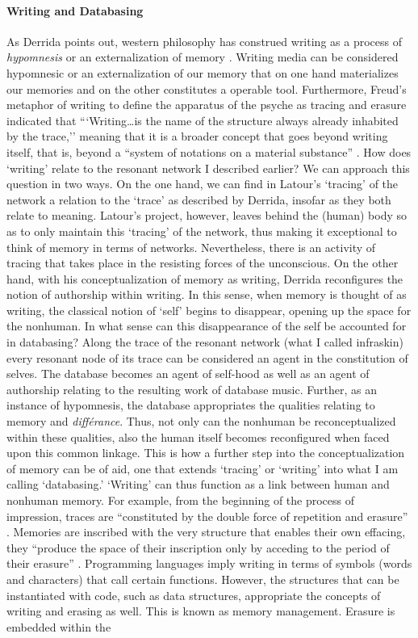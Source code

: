 \paragraph{Writing and Databasing}
As Derrida points out, western philosophy has construed writing as a process of \textit{hypomnesis} or an externalization of memory \parencite[221]{Der78:Wri}. Writing media can be considered hypomnesic or an externalization of our memory that on one hand materializes our memories and on the other constitutes a operable tool. Furthermore, Freud's metaphor of writing to define the apparatus of the psyche as tracing and erasure indicated that ```Writing\dots is the name of the structure always already inhabited by the trace,'' meaning that it is a broader concept that goes beyond writing itself, that is, beyond a ``system of notations on a material sub­stance'' \parencite[xxxix]{Der76:Of}. How does `writing' relate to the resonant network I described earlier? We can approach this question in two ways. On the one hand, we can find in Latour's `tracing' of the network a relation to the `trace' as described by Derrida, insofar as they both relate to meaning. Latour's project, however, leaves behind the (human) body so as to only maintain this `tracing' of the network, thus making it exceptional to think of memory in terms of networks. Nevertheless, there is an activity of tracing that takes place in the resisting forces of the unconscious. On the other hand, with his conceptualization of memory as writing, Derrida reconfigures the notion of authorship within writing. In this sense, when memory is thought of as writing, the classical notion of `self' begins to disappear, opening up the space for the nonhuman. In what sense can this disappearance of the self be accounted for in databasing? Along the trace of the resonant network (what I called infraskin) every resonant node of its trace can be considered an agent in the constitution of selves. The database becomes an agent of self-hood as well as an agent of authorship relating to the resulting work of database music. Further, as an instance of hypomnesis, the database appropriates the qualities relating to memory and \textit{différance}. Thus, not only can the nonhuman be reconceptualized within these qualities, also the human itself becomes reconfigured when faced upon this common linkage. This is how a further step into the conceptualization of memory can be of aid, one that extends `tracing' or `writing' into what I am calling `databasing.' `Writing' can thus function as a link between human and nonhuman memory. For example, from the beginning of the process of impression, traces are ``constituted by the double force of repetition and erasure'' \parencite[226]{Der78:Wri}. Memories are inscribed with the very structure that enables their own effacing, they ``produce the space of their inscription only by acceding to the period of their erasure'' \parencite[226]{Der78:Wri}. Programming languages imply writing in terms of symbols (words and characters) that call certain functions. However, the structures that can be instantiated with code, such as data structures, appropriate the concepts of writing and erasing as well. This is known as memory management. Erasure is embedded within the 
